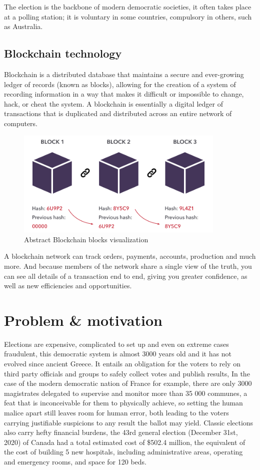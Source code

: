 The election is the backbone of modern democratic societies, it often takes place at a polling station; it is voluntary in some countries, compulsory in others, such as Australia.
\subsection{Blockchain technology}

Blockchain is a distributed database that maintains a secure and ever-growing ledger of records (known as blocks), allowing for the creation of a system of recording information in a way that makes it difficult or impossible to change, hack, or cheat the system. A blockchain is essentially a digital ledger of transactions that is duplicated and distributed across an entire network of computers.

\begin{figure}[h]
	\centering
		\includegraphics[width=10cm]{images/chapter1/blockchain.png}
		\caption{{\footnotesize Abstract Blockchain blocks visualization}}
\end{figure}

A blockchain network can track orders, payments, accounts, production and much more. And because members of the network share a single view of the truth, you can see all details of a transaction end to end, giving you greater confidence, as well as new efficiencies and opportunities.\newpage

\section{Problem \& motivation}

Elections are expensive, complicated to set up and even on extreme cases fraudulent, this democratic system is almost 3000 years old and it has not evolved since ancient Greece. It entails an obligation for the voters to rely on third party officials and groups to safely collect votes and publish results, In the case of the modern democratic nation of France for example, there are only 3000 magistrates delegated to supervise and monitor more than 35 000 communes\cite{ArticleLO274Code}, a feat that is inconceivable for them to physically achieve, so setting the human malice apart still leaves room for human error, both leading to the voters carrying justifiable suspicions to any result the ballot may yield. Classic elections also carry hefty financial burdens, the 43rd general election (December 31st, 2020) of Canada had a total estimated cost of \$502.4 million\cite{EstimatedCost43rd}, the equivalent of the cost of building 5 new hospitals, including administrative areas, operating and emergency rooms, and space for 120 beds\cite{CostBuildHospital}.


